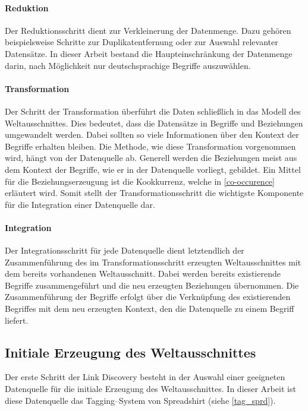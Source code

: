 \paragraph{Reduktion}

Der Reduktionsschritt dient zur Verkleinerung der Datenmenge. Dazu gehören beispielsweise Schritte zur Duplikatentfernung oder zur Auswahl relevanter Datensätze. In dieser Arbeit bestand die Haupteinschränkung der Datenmenge darin, nach Möglichkeit nur deutschsprachige Begriffe auszuwählen.

\paragraph{Transformation}
\label{transformation}

Der Schritt der Transformation überführt die Daten schließlich in das Modell des Weltausschnittes. Dies bedeutet, dass die Datensätze in Begriffe und Beziehungen umgewandelt werden. Dabei sollten so viele Informationen über den Kontext der Begriffe erhalten bleiben. Die Methode, wie diese Transformation vorgenommen wird, hängt von der Datenquelle ab. Generell werden die Beziehungen meist aus dem Kontext der Begriffe, wie er in der Datenquelle vorliegt, gebildet. Ein Mittel für die Beziehungserzeugung ist die Kookkurrenz, welche in \cref{co-occurence} erläutert wird. Somit stellt der Transformationsschritt die wichtigste Komponente für die Integration einer Datenquelle dar.

\paragraph{Integration}

Der Integrationsschritt für jede Datenquelle dient letztendlich der Zusammenführung des im Transformationsschritt erzeugten Weltausschnittes mit dem bereits vorhandenen Weltausschnitt. Dabei werden bereits existierende Begriffe zusammengeführt und die neu erzeugten Beziehungen übernommen. Die Zusammenführung der Begriffe erfolgt über die Verknüpfung des existierenden Begriffes mit dem neu erzeugten Kontext, den die Datenquelle zu einem Begriff liefert.

\subsection{Initiale Erzeugung des Weltausschnittes}

Der erste Schritt der Link Discovery besteht in der Auswahl einer geeigneten Datenquelle für die initiale Erzeugung des Weltausschnittes. In dieser Arbeit ist diese Datenquelle das Tagging--System von Spreadshirt (siehe \cref{tag_sprd}).

